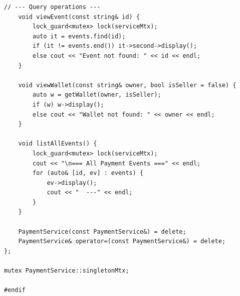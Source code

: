 \documentclass[11pt,a4paper]{article}
\begin{document}
\begin{lstlisting}[title={\texttt{managers.hpp}}]
    // --- Query operations ---
    void viewEvent(const string& id) {
        lock_guard<mutex> lock(serviceMtx);
        auto it = events.find(id);
        if (it != events.end()) it->second->display();
        else cout << "Event not found: " << id << endl;
    }

    void viewWallet(const string& owner, bool isSeller = false) {
        auto w = getWallet(owner, isSeller);
        if (w) w->display();
        else cout << "Wallet not found: " << owner << endl;
    }

    void listAllEvents() {
        lock_guard<mutex> lock(serviceMtx);
        cout << "\n=== All Payment Events ===" << endl;
        for (auto& [id, ev] : events) {
            ev->display();
            cout << "  ---" << endl;
        }
    }

    PaymentService(const PaymentService&) = delete;
    PaymentService& operator=(const PaymentService&) = delete;
};

mutex PaymentService::singletonMtx;

#endif
\end{lstlisting}

\newpage
\end{document}
